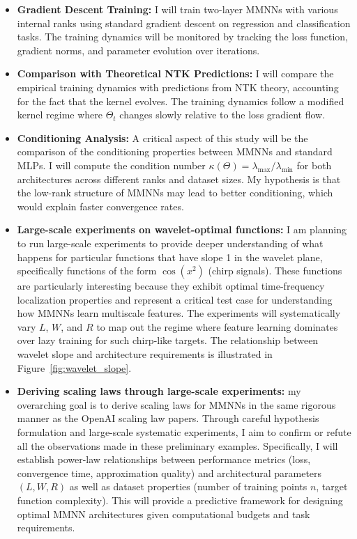 \documentclass[12pt]{article}
\begin{document}
\begin{itemize}
    \item \textbf{Gradient Descent Training:} I will train two-layer MMNNs with various internal ranks using standard gradient descent on regression and classification tasks. The training dynamics will be monitored by tracking the loss function, gradient norms, and parameter evolution over iterations.
    
    \item \textbf{Comparison with Theoretical NTK Predictions:} I will compare the empirical training dynamics with predictions from NTK theory, accounting for the fact that the kernel evolves. The training dynamics follow a modified kernel regime where $\Theta_t$ changes slowly relative to the loss gradient flow.
    
    \item \textbf{Conditioning Analysis:} A critical aspect of this study will be the comparison of the conditioning properties between MMNNs and standard MLPs. I will compute the condition number $\kappa(\Theta) = \lambda_{\max} / \lambda_{\min}$ for both architectures across different ranks and dataset sizes. My hypothesis is that the low-rank structure of MMNNs may lead to better conditioning, which would explain faster convergence rates.
    
    \item \textbf{Large-scale experiments on wavelet-optimal functions:} I am planning to run large-scale experiments to provide deeper understanding of what happens for particular functions that have slope 1 in the wavelet plane, specifically functions of the form $\cos(x^2)$ (chirp signals). These functions are particularly interesting because they exhibit optimal time-frequency localization properties and represent a critical test case for understanding how MMNNs learn multiscale features. The experiments will systematically vary $L$, $W$, and $R$ to map out the regime where feature learning dominates over lazy training for such chirp-like targets. The relationship between wavelet slope and architecture requirements is illustrated in Figure~\ref{fig:wavelet_slope}.
    
    \item \textbf{Deriving scaling laws through large-scale experiments:} my overarching goal is to derive scaling laws for MMNNs in the same rigorous manner as the OpenAI scaling law papers. Through careful hypothesis formulation and large-scale systematic experiments, I aim to confirm or refute all the observations made in these preliminary examples. Specifically, I will establish power-law relationships between performance metrics (loss, convergence time, approximation quality) and architectural parameters $(L, W, R)$ as well as dataset properties (number of training points $n$, target function complexity). This will provide a predictive framework for designing optimal MMNN architectures given computational budgets and task requirements.
\end{itemize}
\end{document}
